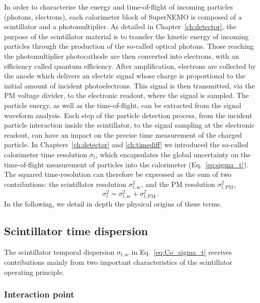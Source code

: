 In order to characterise the energy and time-of-flight of incoming particles (photons, electrons), each calorimeter block of SuperNEMO is composed of a scintillator and a photomultiplier.
As detailed in Chapter~\ref{ch:detector}, the purpose of the scintillator material is to transfer the kinetic energy of incoming particles through the production of the so-called optical photons.
Those reaching the photomultiplier photocathode are then converted into electrons, with an efficiency called quantum efficiency.
After amplification, electrons are collected by the anode which delivers an electric signal whose charge is proportional to the initial amount of incident photoelectrons.
This signal is then transmitted, via the PM voltage divider, to the electronic readout, where the signal is sampled.
The particle energy, as well as the time-of-flight, can be extracted from the signal waveform analysis.
Each step of the particle detection process, from the incident particle interaction inside the scintillator, to the signal sampling at the electronic readout, can have an impact on the precise time measurement of the charged particle.
In Chapters~\ref{ch:detector} and \ref{ch:timediff} we introduced the so-called calorimeter time resolution $\sigma_t$, which encapsulates the global uncertainty on the time-of-flight measurement of particles into the calorimeter (Eq.~\eqref{eq:sigma_t}).
The squared time-resolution can therefore be expressed as the sum of two contributions:
the scintillator resolution $\sigma_{t, \textrm{sc}}^{2}$, and the PM resolution $\sigma_{t, \textrm{PM}}^{2}$,
\begin{equation}
  \sigma_{t}^{2}=\sigma_{t,\text{sc}}^{2}+\sigma_{t,\text{PM}}^{2}\,.
  \label{eq:Co_sigma_t}
\end{equation}
In the following, we detail in depth the physical origins of these terms.

\subsection{Scintillator time dispersion}
The scintillator temporal dispersion $\sigma_{t,\text{sc}}$ in Eq.~\eqref{eq:Co_sigma_t} receives contributions mainly from two important characteristics of the scintillator operating principle.

\subsubsection*{Interaction point}

